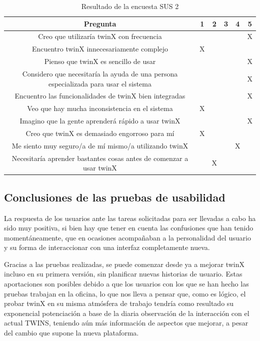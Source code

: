 \begin{table}[H]
	\begin{center}
		\begin{adjustbox}{width=\textwidth}
			\begin{tabular}{ | c | c | c | c | c | c | } 
				\hline
				\textbf{Pregunta} & 1 & 2 & 3 & 4 & 5 \\
				\hline
				Creo que utilizaría twinX con frecuencia &  &  &  &  & X \\
				\hline
				Encuentro twinX innecesariamente complejo &  X &  &  &  &  \\
				\hline
				Pienso que twinX es sencillo de usar &  &  &  &  & X \\
				\hline
				Considero que necesitaría la ayuda de una persona especializada para usar el sistema &  &  &  &  & X \\
				\hline
				Encuentro las funcionalidades de twinX bien integradas &  &  &  &  & X \\
				\hline
				Veo que hay mucha inconsistencia en el sistema & X &  &  &  &  \\
				\hline
				Imagino que la gente aprenderá rápido a usar twinX &  &  &  &  & X \\
				\hline
				Creo que twinX es demasiado engorroso para mí & X &  &  &  &  \\
				\hline
				Me siento muy seguro/a de mí mismo/a utilizando twinX &  &  &  & X &  \\
				\hline
				Necesitaría aprender bastantes cosas antes de comenzar a usar twinX &  & X &  &  &  \\
				\hline
			\end{tabular}
		\end{adjustbox}
		\caption{Resultado de la encuesta SUS 2}
		\label{tab:sus2}
	\end{center}
\end{table}

\subsection{Conclusiones de las pruebas de usabilidad}

La respuesta de los usuarios ante las tareas solicitadas para ser llevadas a cabo ha sido muy positiva, si bien hay que tener en cuenta las confusiones que han tenido momentáneamente, que en ocasiones acompañaban a la personalidad del usuario y su forma de interaccionar con una interfaz completamente nueva.

Gracias a las pruebas realizadas, se puede comenzar desde ya a mejorar twinX incluso en su primera versión, sin planificar nuevas historias de usuario. Estas aportaciones son posibles debido a que los usuarios con los que se han hecho las pruebas trabajan en la oficina, lo que nos lleva a pensar que, como es lógico, el probar twinX en su misma atmósfera de trabajo tendría como resultado su exponencial potenciación a base de la diaria observación de la interacción con el actual TWINS, teniendo aún más información de aspectos que mejorar, a pesar del cambio que supone la nueva plataforma.

